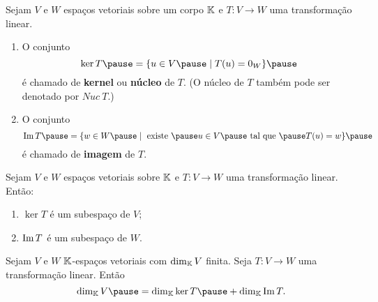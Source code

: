 \documentclass{beamer}
\begin{document}
\begin{frame}
    \begin{definicao}
        Sejam $V$ e $W$ espaços vetoriais sobre um corpo $\mathbb{K}$ \pause e $T \colon V \to W$ uma transformação linear.\pause
        \begin{enumerate}[label={\roman*})]
            \item O conjunto\pause
            \[
            \ker T \pause = \{u \in V \pause \mid T(u) = 0_W\}\pause
            \]
            é chamado de \textbf{kernel} \pause ou \textbf{núcleo} de $T$. \pause (O núcleo de $T$ também pode ser denotado por $Nuc\ T$.)\pause

            \vspace*{1.5cm}

            \item O conjunto\pause
            \[
            \im T \pause = \{w \in W \pause \mid \mbox{ existe } \pause u \in V \pause \mbox{ tal que } \pause T(u) = w\}\pause
            \]
            é chamado de \textbf{imagem} de $T$.
        \end{enumerate}
    \end{definicao}
\end{frame}

\begin{frame}

    \begin{proposicao}
        Sejam $V$ e $W$ espaços vetoriais sobre $\mathbb{K}$ \pause e $T \colon V \to W$ uma transformação linear. \pause Então:\pause
        \begin{enumerate}[label={\roman*})]
            \item $\ker T$ \pause é um subespaço de $V$;\pause

            \vspace*{1cm}

            \item ${\rm Im\,} T$ \pause é um subespaço de $W$.
        \end{enumerate}
    \end{proposicao}
\end{frame}

\begin{frame}
    \begin{teorema}\label{teorema_do_nucleo_e_da_imagem}
        Sejam $V$ e $W$ $\mathbb{K}$-espa\c{c}os vetoriais \pause com $\dim_{\mathbb{K}}V$ finita. \pause Seja $T \colon V \to W$ uma transforma\c{c}\~ao linear. \pause Ent\~ao
        \[
            \dim_\cp{K}V \pause = \dim_\cp{K}\ker T \pause + \dim_\cp{K}\im T.
        \]
    \end{teorema}
\end{frame}
\end{document}
